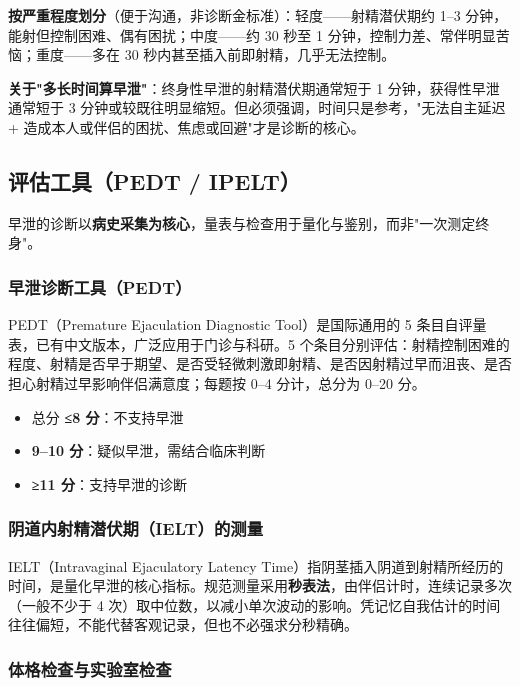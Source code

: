 \noindent\textbf{按严重程度划分}（便于沟通，非诊断金标准）：轻度——射精潜伏期约 1--3 分钟，能射但控制困难、偶有困扰；中度——约 30 秒至 1 分钟，控制力差、常伴明显苦恼；重度——多在 30 秒内甚至插入前即射精，几乎无法控制。

\noindent\textbf{关于"多长时间算早泄"}：终身性早泄的射精潜伏期通常短于 1 分钟，获得性早泄通常短于 3 分钟或较既往明显缩短。但必须强调，时间只是参考，"无法自主延迟 + 造成本人或伴侣的困扰、焦虑或回避"才是诊断的核心。

\subsection{评估工具（PEDT / IPELT）}

早泄的诊断以\textbf{病史采集为核心}，量表与检查用于量化与鉴别，而非"一次测定终身"。

\subsubsection{早泄诊断工具（PEDT）}

PEDT（Premature Ejaculation Diagnostic Tool）是国际通用的 5 条目自评量表，已有中文版本，广泛应用于门诊与科研。5 个条目分别评估：射精控制困难的程度、射精是否早于期望、是否受轻微刺激即射精、是否因射精过早而沮丧、是否担心射精过早影响伴侣满意度；每题按 0--4 分计，总分为 0--20 分。

\begin{itemize}
	\item 总分 \textbf{≤8 分}：不支持早泄
	\item \textbf{9--10 分}：疑似早泄，需结合临床判断
	\item \textbf{≥11 分}：支持早泄的诊断
\end{itemize}

\subsubsection{阴道内射精潜伏期（IELT）的测量}

IELT（Intravaginal Ejaculatory Latency Time）指阴茎插入阴道到射精所经历的时间，是量化早泄的核心指标。规范测量采用\textbf{秒表法}，由伴侣计时，连续记录多次（一般不少于 4 次）取中位数，以减小单次波动的影响。凭记忆自我估计的时间往往偏短，不能代替客观记录，但也不必强求分秒精确。

\subsubsection{体格检查与实验室检查}

